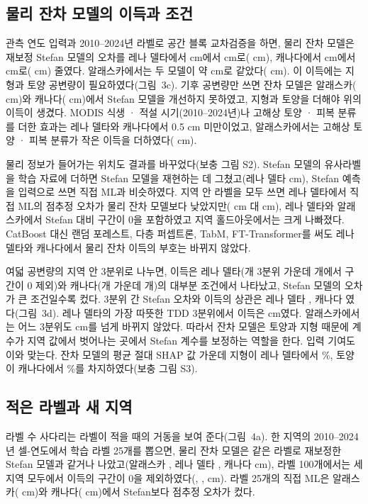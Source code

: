 \subsection{물리 잔차 모델의 이득과 조건}
관측 연도 입력과 2010--2024년 라벨로 공간 블록 교차검증을 하면, 물리 잔차 모델은 재보정 Stefan 모델의 오차를 레나 델타에서 \nrmseLeblkPo{} cm에서 \nrmseLeblkRo{} cm로(\ndrefLeblkRo{} cm), 캐나다에서 \nrmseCablkPo{} cm에서 \nrmseCablkRo{} cm로(\ndrefCablkRo{} cm) 줄였다. 알래스카에서는 두 모델이 약 \nrmseAkblkRo{} cm로 같았다(\ndrefAkblkRo{} cm). 이 이득에는 지형과 토양 공변량이 필요하였다(그림~3c). 기후 공변량만 쓰면 잔차 모델은 알래스카(\ndfeatAkFclim{} cm)와 캐나다(\ndfeatCaFclim{} cm)에서 Stefan 모델을 개선하지 못하였고, 지형과 토양을 더해야 위의 이득이 생겼다. MODIS 식생 · 적설 시기(2010--2024년)나 고해상 토양 · 피복 분류를 더한 효과는 레나 델타와 캐나다에서 0.5 cm 미만이었고, 알래스카에서는 고해상 토양 · 피복 분류가 작은 이득을 더하였다(\ndfeatAkFhires{} cm).

물리 정보가 들어가는 위치도 결과를 바꾸었다(보충 그림 S2). Stefan 모델의 유사라벨을 학습 자료에 더하면 Stefan 모델을 재현하는 데 그쳤고(레나 델타 \ndrefLeblkDo{} cm), Stefan 예측을 입력으로 쓰면 직접 ML과 비슷하였다. 지역 안 라벨을 모두 쓰면 레나 델타에서 직접 ML의 점추정 오차가 물리 잔차 모델보다 낮았지만(\nrmseLeblkDz{} cm 대 \nrmseLeblkRo{} cm), 레나 델타와 알래스카에서 Stefan 대비 구간이 0을 포함하였고 지역 홀드아웃에서는 크게 나빠졌다. CatBoost 대신 랜덤 포레스트, 다층 퍼셉트론, TabM, FT-Transformer를 써도 레나 델타와 캐나다에서 물리 잔차 이득의 부호는 바뀌지 않았다.

여덟 공변량의 지역 안 3분위로 나누면, 이득은 레나 델타(\ngcLecells{}개 3분위 가운데 \ngcLesig{}개에서 구간이 0 제외)와 캐나다(\ngcCacells{}개 가운데 \ngcCasig{}개)의 대부분 조건에서 나타났고, Stefan 모델의 오차가 큰 조건일수록 컸다. 3분위 간 Stefan 오차와 이득의 상관은 레나 델타 \ngcLecorr, 캐나다 \ngcCacorr{}였다(그림~3d). 레나 델타의 가장 따뜻한 TDD 3분위에서 이득은 \ndtddLewarm{} cm였다. 알래스카에서는 어느 3분위도 \ngcAkmaxabs{} cm를 넘게 바뀌지 않았다. 따라서 잔차 모델은 토양과 지형 때문에 계수가 지역 값에서 벗어나는 곳에서 Stefan 계수를 보정하는 역할을 한다. 입력 기여도 이와 맞는다. 잔차 모델의 평균 절대 SHAP 값 가운데 지형이 레나 델타에서 \nshapLeResTerrain\%, 토양이 캐나다에서 \nshapCaResSoil\%를 차지하였다(보충 그림 S3).

\subsection{적은 라벨과 새 지역}
라벨 수 사다리는 라벨이 적을 때의 거동을 보여 준다(그림~4a). 한 지역의 2010--2024년 셀-연도에서 학습 라벨 25개를 뽑으면, 물리 잔차 모델은 같은 라벨로 재보정한 Stefan 모델과 같거나 나았고(알래스카 \nllAkRotwfive, 레나 델타 \nllLeRotwfive, 캐나다 \nllCaRotwfive{} cm), 라벨 100개에서는 세 지역 모두에서 이득의 구간이 0을 제외하였다(\nllAkRohundred, \nllLeRohundred, \nllCaRohundred{} cm). 라벨 25개의 직접 ML은 알래스카(\nllAkDztwfive{} cm)와 캐나다(\nllCaDztwfive{} cm)에서 Stefan보다 점추정 오차가 컸다.

